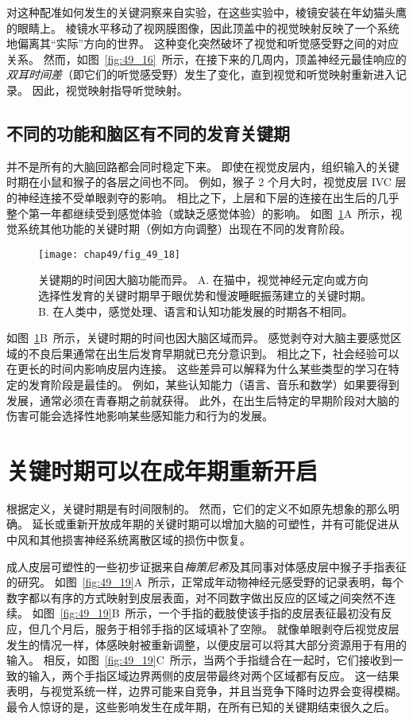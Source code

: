对这种配准如何发生的关键洞察来自实验，在这些实验中，棱镜安装在年幼猫头鹰的眼睛上。
棱镜水平移动了视网膜图像，因此顶盖中的视觉映射反映了一个系统地偏离其“实际”方向的世界。
这种变化突然破坏了视觉和听觉感受野之间的对应关系。
然而，如图~\ref{fig:49_16}~所示，在接下来的几周内，顶盖神经元最佳响应的\textit{双耳时间差}（即它们的听觉感受野）发生了变化，直到视觉和听觉映射重新进入记录。
因此，视觉映射指导听觉映射。


\subsection{不同的功能和脑区有不同的发育关键期}

并不是所有的大脑回路都会同时稳定下来。
即使在视觉皮层内，组织输入的关键时期在小鼠和猴子的各层之间也不同。
例如，猴子 2 个月大时，视觉皮层 IVC 层的神经连接不受单眼剥夺的影响。
相比之下，上层和下层的连接在出生后的几乎整个第一年都继续受到感觉体验（或缺乏感觉体验）的影响。
如图~\ref{fig:49_18}A~所示，视觉系统其他功能的关键时期（例如方向调整）出现在不同的发育阶段。


\begin{figure}[htbp]
	\centering
	\texttt{[image: chap49/fig\_49\_18]}
	\caption{关键期的时间因大脑功能而异。
		A. 在猫中，视觉神经元定向或方向选择性发育的关键时期早于眼优势和慢波睡眠振荡建立的关键时期。
        B. 在人类中，感觉处理、语言和认知功能发展的时期各不相同。}
	\label{fig:49_18}
\end{figure}


如图~\ref{fig:49_18}B~所示，关键时期的时间也因大脑区域而异。
感觉剥夺对大脑主要感觉区域的不良后果通常在出生后发育早期就已充分意识到。
相比之下，社会经验可以在更长的时间内影响皮层内连接。
这些差异可以解释为什么某些类型的学习在特定的发育阶段是最佳的。
例如，某些认知能力（语言、音乐和数学）如果要得到发展，通常必须在青春期之前就获得。
此外，在出生后特定的早期阶段对大脑的伤害可能会选择性地影响某些感知能力和行为的发展。



\section{关键时期可以在成年期重新开启}

根据定义，关键时期是有时间限制的。
然而，它们的定义不如原先想象的那么明确。
延长或重新开放成年期的关键时期可以增加大脑的可塑性，并有可能促进从中风和其他损害神经系统离散区域的损伤中恢复。

成人皮层可塑性的一些初步证据来自\textit{梅策尼希}及其同事对体感皮层中猴子手指表征的研究。
如图~\ref{fig:49_19}A~所示，正常成年动物神经元感受野的记录表明，每个数字都以有序的方式映射到皮层表面，对不同数字做出反应的区域之间突然不连续。
如图~\ref{fig:49_19}B~所示，一个手指的截肢使该手指的皮层表征最初没有反应，但几个月后，服务于相邻手指的区域填补了空隙。
就像单眼剥夺后视觉皮层发生的情况一样，体感映射被重新调整，以便皮层可以将其大部分资源用于有用的输入。
相反，如图~\ref{fig:49_19}C~所示，当两个手指缝合在一起时，它们接收到一致的输入，两个手指区域边界两侧的皮层带最终对两个区域都有反应。
这一结果表明，与视觉系统一样，边界可能来自竞争，并且当竞争下降时边界会变得模糊。
最令人惊讶的是，这些影响发生在成年期，在所有已知的关键期结束很久之后。



